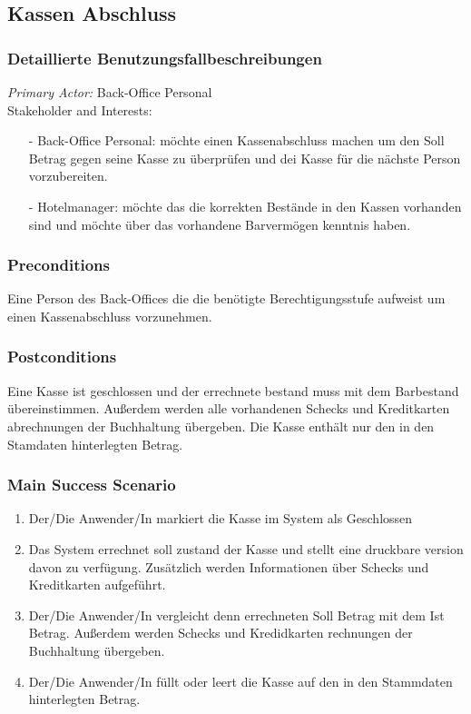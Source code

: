 \documentclass[./detailed_overview_usecases.tex]{subfiles}
\begin{document}
    \subsection{Kassen Abschluss}
    \subsubsection{Detaillierte Benutzungsfallbeschreibungen}
    \textit{Primary Actor:}
    Back-Office Personal
    \\
    Stakeholder and Interests:
    \begin{itemize}
        \item[-] Back-Office Personal: möchte einen Kassenabschluss
        machen um den Soll Betrag gegen seine Kasse zu überprüfen und dei Kasse für
        die nächste Person vorzubereiten.
        \item[-] Hotelmanager: möchte das die korrekten Bestände in
        den Kassen vorhanden sind und möchte über das vorhandene Barvermögen
        kenntnis haben.
    \end{itemize}

    \subsubsection*{Preconditions}
    Eine Person des Back-Offices die die benötigte Berechtigungsstufe
    aufweist um einen Kassenabschluss vorzunehmen.

    \subsubsection*{Postconditions}
    Eine Kasse ist geschlossen und der errechnete bestand muss mit dem
    Barbestand übereinstimmen. Außerdem werden alle vorhandenen Schecks und
    Kreditkarten abrechnungen der Buchhaltung übergeben.
    Die Kasse enthält nur den in den Stamdaten hinterlegten Betrag.

    \subsubsection*{Main Success Scenario}
    \begin{enumerate}
        \item Der/Die Anwender/In markiert die Kasse im System als Geschlossen
        \item Das System errechnet soll zustand der Kasse und stellt eine druckbare
        version davon zu verfügung. Zusätzlich werden Informationen über Schecks und Kreditkarten
        aufgeführt.
        \item Der/Die Anwender/In vergleicht denn errechneten Soll Betrag mit dem
        Ist Betrag. Außerdem werden Schecks und Kredidkarten rechnungen der Buchhaltung übergeben.
        \item Der/Die Anwender/In füllt oder leert die Kasse auf den in den Stammdaten hinterlegten Betrag.
    \end{enumerate}
\end{document}
